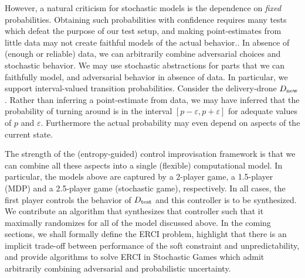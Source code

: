 
 However, a natural criticism for stochastic
models is the dependence on \emph{fixed} probabilities. 
Obtaining such probabilities with confidence requires many tests which defeat the purpose of our test setup, and making point-estimates from little data may not create faithful models of the actual behavior..
  In absence of (enough or reliable) data, we can arbitrarily combine
adversarial choices and stochastic behavior. We may use stochastic abstractions for parts that we can faithfully model, and adversarial behavior in absence of data.
In particular, we
support interval-valued transition probabilities.  Consider the
delivery-drone ${D_{\text{new}}}$. Rather than inferring a point-estimate
from data, we may have inferred that the probability of turning around
is in the interval $[p - \varepsilon, p + \varepsilon]$ for adequate
values of $p$ and $\varepsilon$.  Furthermore the actual probability
may even depend on aspects of the current state.

The strength of the (entropy-guided) control improvisation framework
is that we can combine all these aspects into a single (flexible)
computational model. 
In particular, the models above are captured by a 2-player game, a 1.5-player (MDP) and a 2.5-player game (stochastic game), respectively.
In all cases, the first player controls the behavior of ${D_{\text{test}}}$ and this controller is to be synthesized. 
We contribute an algorithm that synthesizes that controller such that
it  maximally randomizes for all of the model discussed above. In the
coming sections, we shall formally define the ERCI problem, highlight
that there is an implicit trade-off between performance of the soft
constraint and unpredictability, and provide algorithms to solve ERCI
in Stochastic Games which admit arbitrarily combining adversarial and
probabilistic uncertainty.



